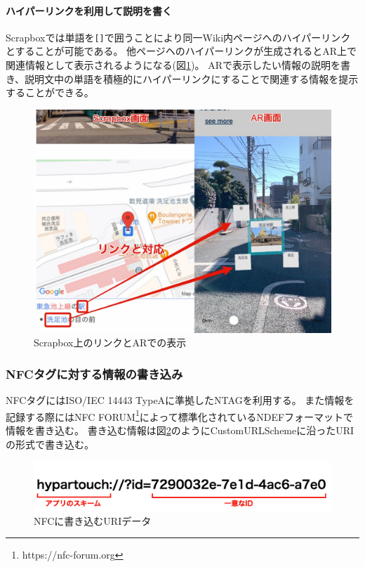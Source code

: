 \paragraph*{ハイパーリンクを利用して説明を書く}
Scrapboxでは単語を\texttt{[]}で囲うことにより同一Wiki内ページへのハイパーリンクとすることが可能である。
他ページヘのハイパーリンクが生成されるとAR上で関連情報として表示されるようになる(図\ref{fig:scrapbox_link_and_ar})。
ARで表示したい情報の説明を書き、説明文中の単語を積極的にハイパーリンクにすることで関連する情報を提示することができる。

\begin{figure}[H]
  \centering
  \includegraphics[width=120mm]{images/scrapbox_link_and_ar.jpg}
  \caption{Scrapbox上のリンクとARでの表示} \label{fig:scrapbox_link_and_ar}
\end{figure}

\subsubsection{NFCタグに対する情報の書き込み}
NFCタグにはISO/IEC 14443 TypeAに準拠したNTAGを利用する。
また情報を記録する際にはNFC FORUM\footnote{\textsf{https://nfc-forum.org}}によって標準化されているNDEFフォーマットで情報を書き込む。
書き込む情報は図\ref{fig:nfc_uri}のようにCustomURLSchemeに沿ったURIの形式で書き込む。

\begin{figure}[H]
  \centering
  \includegraphics[width=120mm]{images/nfc_uri.png}
  \caption{NFCに書き込むURIデータ} \label{fig:nfc_uri}
\end{figure}

